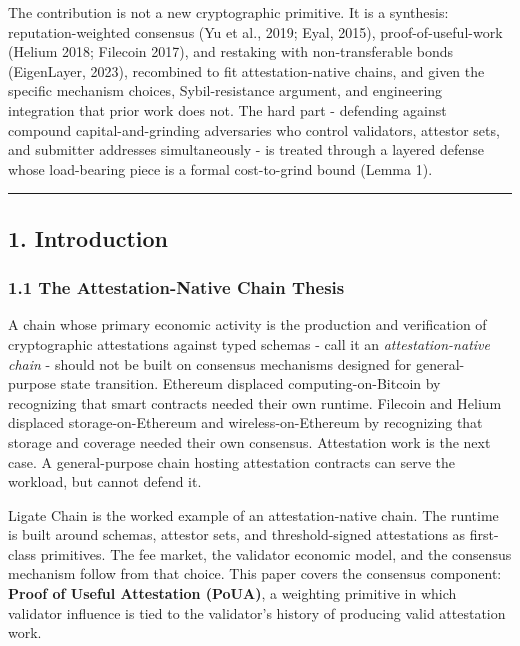 \documentclass[
  11pt,
]{article}
\begin{document}
The contribution is not a new cryptographic primitive. It is a
synthesis: reputation-weighted consensus (Yu et al., 2019; Eyal, 2015),
proof-of-useful-work (Helium 2018; Filecoin 2017), and restaking with
non-transferable bonds (EigenLayer, 2023), recombined to fit
attestation-native chains, and given the specific mechanism choices,
Sybil-resistance argument, and engineering integration that prior work
does not. The hard part - defending against compound
capital-and-grinding adversaries who control validators, attestor sets,
and submitter addresses simultaneously - is treated through a layered
defense whose load-bearing piece is a formal cost-to-grind bound (Lemma
1).

\begin{center}\rule{0.5\linewidth}{0.5pt}\end{center}

\subsection{1. Introduction}\label{introduction}

\subsubsection{1.1 The Attestation-Native Chain
Thesis}\label{the-attestation-native-chain-thesis}

A chain whose primary economic activity is the production and
verification of cryptographic attestations against typed schemas - call
it an \emph{attestation-native chain} - should not be built on consensus
mechanisms designed for general-purpose state transition. Ethereum
displaced computing-on-Bitcoin by recognizing that smart contracts
needed their own runtime. Filecoin and Helium displaced
storage-on-Ethereum and wireless-on-Ethereum by recognizing that storage
and coverage needed their own consensus. Attestation work is the next
case. A general-purpose chain hosting attestation contracts can serve
the workload, but cannot defend it.

Ligate Chain is the worked example of an attestation-native chain. The
runtime is built around schemas, attestor sets, and threshold-signed
attestations as first-class primitives. The fee market, the validator
economic model, and the consensus mechanism follow from that choice.
This paper covers the consensus component: \textbf{Proof of Useful
Attestation (PoUA)}, a weighting primitive in which validator influence
is tied to the validator's history of producing valid attestation work.
\end{document}
